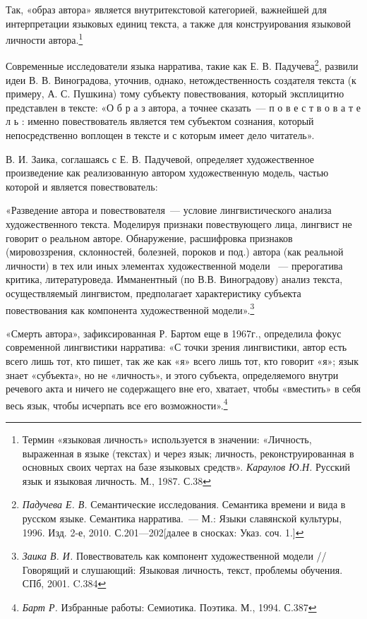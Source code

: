 \documentclass{kursa4}
\begin{document}
      Так, «образ автора» является внутритекстовой категорией, важнейшей
      для интерпретации языковых единиц текста, а также для конструирования
      языковой личности автора.\footnote{{Термин «языковая
      личность» используется в значении: «Личность, выраженная в языке
      (текстах) и через язык; личность, реконструированная в основных своих
      чертах на базе языковых средств». }\textit{{Караулов
      Ю.Н. }}{Русский язык и языковая личность. М., 1987.
      С.38}} 

      Современные исследователи языка нарратива, такие как Е. В.
      Падучева\footnote{\textit{{Падучева Е. В.
      }}{Семантические исследования. Семантика времени и
      вида в русском языке. Семантика нарратива.~--- М.: Языки славянской
      культуры, 1996. Изд. 2-е, 2010. С.201—202[далее в сносках: Указ. соч.
      1.]}}, развили идеи В. В. Виноградова, уточнив, однако,
      нетождественность создателя текста (к примеру, А. С. Пушкина) тому
      субъекту повествования, который эксплицитно представлен в
      тексте:\newline
      «О б р а з автора, а точнее сказать~--- п о в е с т в о в а т е л ь :
      именно повествователь является тем субъектом сознания, который
      непосредственно воплощен в тексте и с которым имеет дело читатель». 

      В. И. Заика, соглашаясь с Е. В. Падучевой, определяет художественное
      произведение как реализованную автором художественную модель, частью
      которой и является повествователь:

      «Разведение автора и повествователя~--- условие лингвистического
      анализа художественного текста. Моделируя признаки повествующего лица,
      лингвист не говорит о реальном авторе. Обнаружение, расшифровка
      признаков (мировоззрения, склонностей, болезней, пороков и под.) автора
      (как реальной личности) в тех или иных элементах художественной модели
     ~--- прерогатива критика, литературоведа. Имманентный (по В.В.
      Виноградову) анализ текста, осуществляемый лингвистом, предполагает
      характеристику субъекта повествования как компонента художественной
      модели».\footnote{\textit{{Заика В. И.
      }}{Повествователь как компонент художественной модели
      //Говорящий и слушающий: Языковая личность, текст, проблемы обучения.
      СПб, 2001. C.384}}

      «Смерть автора», зафиксированная Р. Бартом еще в 1967г., определила
      фокус современной лингвистики нарратива:\newline
      «С точки зрения лингвистики, автор есть всего лишь тот, кто пишет,
      так же как «я» всего лишь тот, кто говорит «я»; язык знает «субъекта»,
      но не «личность», и этого субъекта, определяемого внутри речевого акта
      и ничего не содержащего вне его, хватает, чтобы «вместить» в себя весь
      язык, чтобы исчерпать все его
      возможности».\footnote{\textit{{Барт
      Р.}}{ Избранные работы: Семиотика. Поэтика. М., 1994.
      С.387}}
\end{document}
